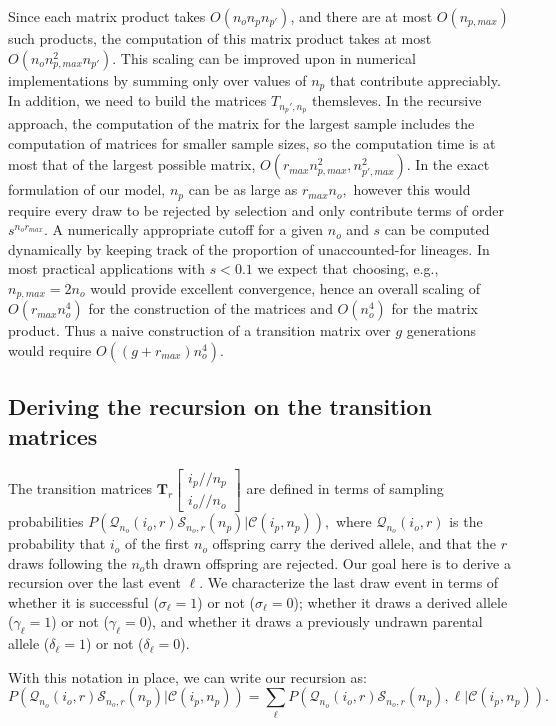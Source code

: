 \documentclass[review]{elsarticle}
\newcommand{\dslash}{/\!\!/}
\newcommand{\Coalc}[4]{\begin{bmatrix}#1\dslash #2 \\ #3\dslash #4 \end{bmatrix}}
\newcommand{\CC}{\mathcal{C}}
\newcommand{\ms}{\mathcal{S}}
\newcommand{\QQ}{\mathcal{Q}}
\begin{document}
Since each matrix
product takes $O(n_o n_p n_{p'})$, and there are at most $O(n_{p,max})$ such products, the computation of this
matrix product takes at most $O(n_o n_{p,max}^2 n_{p'}).$ This scaling can be improved upon in numerical 
implementations by summing only over values of $n_p$ that contribute appreciably. 
In addition, we need to build the matrices $T_{n_p', n_p}$ themsleves. 
In the recursive approach, the computation of the matrix for the largest sample includes the computation of matrices for
smaller sample sizes, so the computation time is at most that of the largest possible matrix, $O(r_{max} n_{p,max}^2, n_{p',max}^2).$ 
In the exact formulation of our model, $n_p$ can be as large as $ r_{max} n_o,$ however this would require every draw to be rejected by selection and
 only contribute terms of order $s^{n_o r_{max}}.$ A numerically appropriate cutoff for a given $n_o$ and $s$ can be computed dynamically 
 by keeping track of the proportion of unaccounted-for lineages. In most practical applications with $s<0.1$ we expect that choosing, e.g.,  
 $n_{p,max}=  2 n_o$ would provide excellent convergence, hence an overall scaling of   $O(r_{max} n_{o}^4)$ for the construction of 
 the matrices and $O(n_o^4)$ for the matrix product.
Thus a naive construction of a transition matrix over $g$ generations would require  $O( (g + r_{max} ) n_o^4).$ 

\subsection{Deriving the recursion on the transition matrices}
\label{subsec_apx_tpm_deriv}

The transition matrices $\mathbf{T}_{r}\Coalc{i_p}{n_p}{i_o}{n_o}$ are defined in terms of sampling
probabilities $P(\QQ_{n_o}(i_o,r) \ms_{n_o,r}(n_p) | \CC{(i_p,n_p)} ),$ where $\QQ_{n_o}(i_o,r)$ is the
probability that $i_o$ of the first $n_o$ offspring carry the derived allele, and that the $r$
draws following the $n_o$th drawn offspring are rejected. Our goal here is to derive a recursion
over the last event $\ell$. We characterize the last draw event in terms of whether it is
successful ($\sigma_\ell=1$) or not ($\sigma_\ell=0$); whether it draws a derived allele
($\gamma_\ell=1$) or not ($\gamma_\ell=0$), and whether it draws a previously undrawn parental
allele ($\delta_\ell=1$) or not ($\delta_\ell=0$).

With this notation in place, we can write our recursion as: 
 \begin{equation}
  P(\QQ_{n_o}(i_o,r) \ms_{n_o,r}(n_p) | \CC{(i_p,n_p)} ) = \sum_\ell P(\QQ_{n_o}(i_o,r) \ms_{n_o,r}(n_p),\ell | \CC(i_p,n_p) ) . 
 \end{equation}
\end{document}
